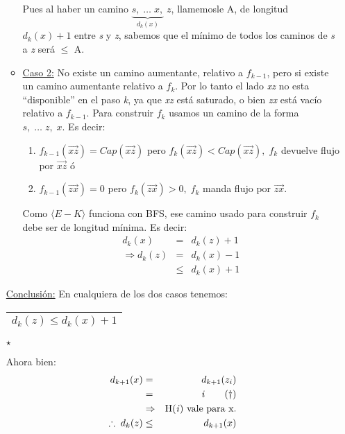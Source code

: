 \documentclass[12pt,a4paper]{report}
\begin{document}
\begin{enumerate}
\begin{itemize}
							\vspace{2mm}
							\par Pues al haber un camino $\underbrace{s, \; \dotsc \; x,}_{d_{k}(x)} \; z$, llamemosle A, de longitud $d_{k}(x) + 1$ entre \textit{s} y \textit{z}, sabemos que el mínimo de todos los caminos de \textit{s} a \textit{z} será $\leq$ A.
						\item \underline{Caso 2:} No existe un camino aumentante, relativo a $f_{k - 1}$, pero si existe un camino aumentante relativo a $f_{k}$. Por lo tanto el lado \textit{xz} no esta \textquotedblleft disponible\textquotedblright \; en el paso \textit{k}, ya que \textit{xz} está saturado, o bien \textit{zx} está vacío relativo a $f_{k - 1}$. Para construir $f_{k}$ usamos un camino de la forma $s, \; \dotsc \; z, \; x$. Es decir:
							\vspace{5mm}
							\begin{enumerate}[1)]
								\item $f_{k - 1}(\overrightarrow{xz}) = Cap(\overrightarrow{xz})$ pero $f_{k}(\overrightarrow{xz}) < Cap(\overrightarrow{xz}), \; f_{k}$ devuelve flujo por $\overrightarrow{xz}$ ó
								\item $f_{k - 1}(\overrightarrow{zx}) = 0$ pero $f_{k}(\overrightarrow{zx}) > 0, \; f_{k}$ manda flujo por $\overrightarrow{zx}$.
							\end{enumerate}

							\vspace{5mm}
							\par Como $\langle E-K \rangle$ funciona con BFS, ese camino usado para construir $f_{k}$ debe ser de longitud mínima. Es decir:
							\begin{eqnarray}
								\nonumber d_{k}(x) &=& d_{k}(z) + 1 \\
								\nonumber \Rightarrow d_{k}(z) &=& d_{k}(x) - 1 \\
								\nonumber &\leq & d_{k}(x) + 1
							\end{eqnarray}
					\end{itemize}

				\underline{Conclusión:} En cualquiera de los dos casos tenemos:
				\begin{center}
					\begin{tabular}{|c|} \hline $d_{k}(z) \leq d_{k}(x) + 1$ \\\hline \end{tabular} $\star$
				\end{center}

				\par Ahora bien:
				\begin{eqnarray}
					\nonumber d_{k + 1}(x) &=& d_{k + 1}(z_{i}) \\
					\nonumber &=& i \qquad (\dag) \\
					\nonumber &\Rightarrow & \textup{H(\textit{i}) vale para x.} \\
					\nonumber \therefore \; d_{k}(z) & \leq & d_{k + 1}(x)
				\end{eqnarray}


\end{enumerate}
\end{document}
